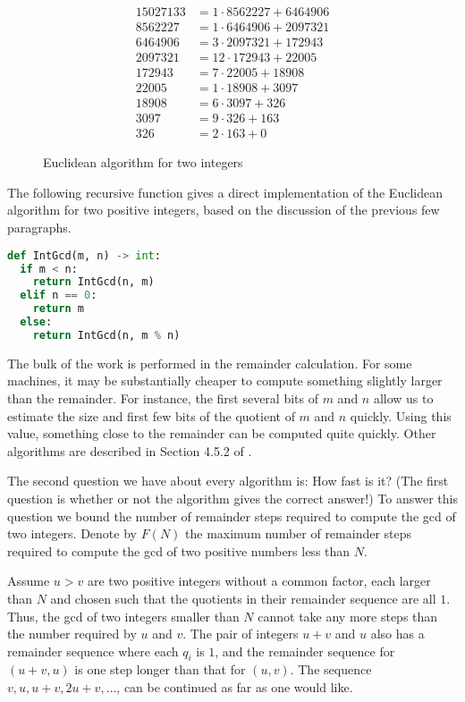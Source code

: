 \begin{figure}
\[
\begin{aligned}
  15027133 &= 1 \cdot 8562227 + 6464906\\
  8562227  &= 1 \cdot 6464906 + 2097321\\
  6464906  &= 3 \cdot 2097321 + 172943\\
  2097321  &= 12 \cdot 172943  + 22005\\
  172943   &= 7 \cdot 22005   + 18908\\
  22005    &= 1 \cdot 18908   + 3097\\
  18908    &= 6 \cdot 3097    + 326\\
  3097     &= 9 \cdot 326     + 163\\
  326      &= 2 \cdot 163     + 0
\end{aligned}
\]
\caption{Euclidean algorithm for two integers\label{Int:Euclid:Alg:Fig}}
\end{figure}


The following recursive function gives a direct implementation of the
Euclidean algorithm for two positive integers, based on the discussion
of the previous few paragraphs.

\begin{lstlisting}[language=Python]
def IntGcd(m, n) -> int:
  if m < n:
    return IntGcd(n, m)
  elif n == 0:
    return m
  else:
    return IntGcd(n, m % n)
\end{lstlisting}

The bulk of the work is performed in the remainder calculation.  For
some machines, it may be substantially cheaper to compute something
slightly larger than the remainder.  For instance, the first several
bits of $m$ and $n$ allow us to estimate the size and first few bits
of the quotient of $m$ and $n$ quickly.  Using this value, something
close to the remainder can be computed quite quickly.  Other
algorithms are described in Section 4.5.2 of {\Knuth} \cite{Knuth1997-tf}.

The second question we have about every algorithm is: How fast is it?
(The first question is whether or not the algorithm gives the correct
answer!)  To answer this question we bound the number of remainder
steps required 
to compute the {\sc gcd} of two integers.  Denote by $F(N)$ the
maximum number of 
remainder steps required to compute the {\sc gcd} of two positive
numbers less than $N$.

Assume $u > v$ are two positive integers without a common factor, each
larger than $N$ and chosen such that the quotients in their remainder
sequence are all $1$.  Thus, the {\sc gcd} of two integers smaller
than $N$ cannot take any more steps than the number required by $u$
and $v$.  The pair of integers $u+v$ and $u$ also has a remainder
sequence where each $q_i$ is $1$, and the remainder sequence for
$(u+v, u)$ is one step longer than that for $(u, v)$.  The sequence
$v, u, u+v, 2u+v,
\ldots$, can be continued as far as one would like.

